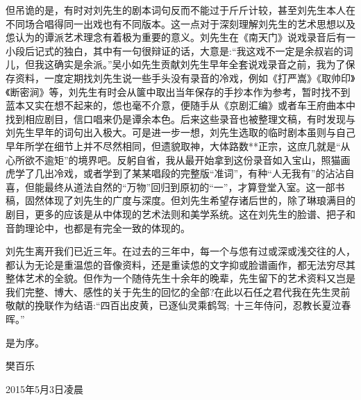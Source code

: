 但吊诡的是，有时对刘先生的剧本词句反而不能过于斤斤计较，甚至刘先生本人在不同场合唱得同一出戏也有不同版本。这一点对于深刻理解刘先生的艺术思想以及怹认为的谭派艺术理念有着极为重要的意义。刘先生在《南天门》说戏录音后有一小段后记式的独白，其中有一句很辩证的话，大意是:``我这戏不一定是余叔岩的词儿，但我这确实是余派。''吴小如先生贡献刘先生早年全套说戏录音之前，我为了保存资料，一度定期找刘先生说一些手头没有录音的冷戏，例如《打严嵩》《取帅印》《断密涧》等，刘先生有时会从箧中取出当年保存的手抄本作为参考，暂时找不到蓝本又实在想不起来的，怹也毫不介意，便随手从《京剧汇编》或者车王府曲本中找到相应剧目，信口唱来仍是谭余本色。后来这些录音也被整理文稿，有时发现与刘先生早年的词句出入极大。可是进一步一想，刘先生选取的临时剧本虽则与自己早年所学在细节上并不尽然相同，但遗貌取神，大体路数**正宗，这庶几就是``从心所欲不逾矩''的境界吧。反躬自省，我从最开始拿到这份录音如入宝山，照猫画虎学了几出冷戏，或者学到了某某唱段的完整版``准词''，有种``人无我有''的沾沾自喜，但能最终从道法自然的``万物''回归到原初的``一''，才算登堂入室。这一部书稿，固然体现了刘先生的广度与深度。但刘先生希望存诸后世的，除了琳琅满目的剧目，更多的应该是从中体现的艺术法则和美学系统。这在刘先生的脸谱、把子和音韵理论中，也都是有完全一致的体现的。

刘先生离开我们已近三年。在过去的三年中，每一个与怹有过或深或浅交往的人，都认为无论是重温怹的音像资料，还是重读怹的文字抑或脸谱画作，都无法穷尽其整体艺术的全貌。但作为一个随侍先生十余年的晚辈，先生留下的艺术资料又岂是我们完整、博大、感性的关于先生的回忆的全部?在此以石任之君代我在先生灵前敬献的挽联作为结语:``四百出皮黄，已逐仙灵乘鹤驾;~十三年侍问，忍教长夏泣春晖。''

是为序。

\begin{flushright}
樊百乐

\textrm{2015}年\textrm{5}月\textrm{3}日凌晨
\end{flushright}

